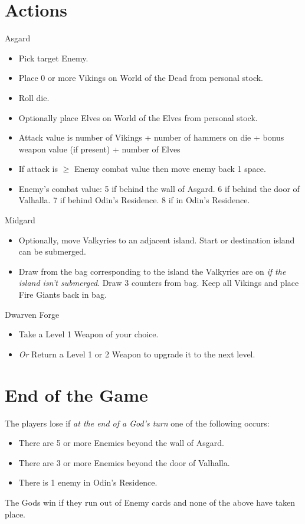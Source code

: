 \documentclass[12pt]{article}
\newenvironment{itemizeCustom}
{\begin{itemize}
  \setlength{\itemsep}{1pt}
  \setlength{\parskip}{0pt}
  \setlength{\parsep}{0pt}}
{\end{itemize}}
\begin{document}
\begin{mdframed}[style = customFrame]
\begin{multicols*}{2}
\section*{Actions}
Asgard
\begin{itemizeCustom}
	\item Pick target Enemy.
	\item Place 0 or more Vikings on World of the Dead from personal stock.
	\item Roll die.
	\item Optionally place Elves on World of the Elves from personal stock.
	\item Attack value is number of Vikings + number of hammers on die + bonus weapon value (if present) + number of Elves
	\item If attack is $\ge$ Enemy combat value then move enemy back 1 space.
	\item Enemy's combat value: 5 if behind the wall of Asgard. 6 if behind the door of Valhalla. 7 if behind Odin's Residence. 8 if in Odin's Residence.
\end{itemizeCustom}

\noindent
Midgard
\begin{itemizeCustom}
	\item Optionally, move Valkyries to an adjacent island. Start or destination island can be submerged.
	\item Draw from the bag corresponding to the island the Valkyries are on \emph{if the island isn't submerged}. Draw 3 counters from bag. Keep all Vikings and place Fire Giants back in bag.
\end{itemizeCustom}

\noindent
Dwarven Forge
\begin{itemizeCustom}
	\item Take a Level 1 Weapon of your choice.
	\item \emph{Or} Return a Level 1 or 2 Weapon to upgrade it to the next level.
\end{itemizeCustom}

\section*{End of the Game}
The players lose if \emph{at the end of a God's turn} one of the following occurs:
\begin{itemizeCustom}
	\item There are 5 or more Enemies beyond the wall of Asgard.
	\item There are 3 or more Enemies beyond the door of Valhalla.
	\item There is 1 enemy in Odin's Residence.
\end{itemizeCustom}

\noindent
The Gods win if they run out of Enemy cards and none of the above have taken place.

\end{multicols*}
\end{mdframed}
\end{document}
